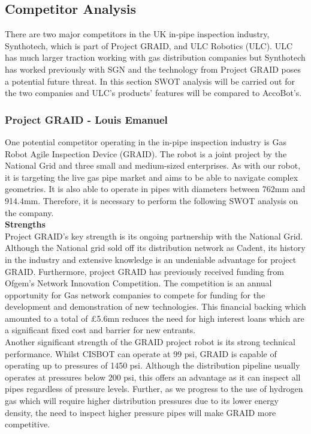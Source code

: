 \documentclass[11pt]{article}		%
\begin{document}
    \subsection{Competitor Analysis}
        There are two major competitors in the UK in-pipe inspection industry, Synthotech, which is part of Project GRAID, and ULC Robotics (ULC). ULC has much larger traction working with gas distribution companies but Synthotech has worked previously with SGN and the technology from Project GRAID poses a potential future threat. In this section SWOT analysis will be carried out for the two companies and ULC's products' features will be compared to AccoBot's.

		\subsubsection[Project GRAID]{Project GRAID - Louis Emanuel}
		
			One potential competitor operating in the in-pipe inspection industry is Gas Robot Agile Inspection Device (GRAID). The robot is a joint project by the National Grid and three small and medium-sized enterprises. As with our robot, it is targeting the live gas pipe market and aims to be able to navigate complex geometries. It is also able to operate in pipes with diameters between 762mm and 914.4mm. Therefore, it is necessary to perform the following SWOT analysis on the company. \\
			
			\textbf{Strengths} \\
			Project GRAID's key strength is its ongoing partnership with the National Grid. Although the National grid sold off its distribution network as Cadent, its history in the industry and extensive knowledge is an undeniable advantage for project GRAID. Furthermore, project GRAID has previously received funding from Ofgem's Network Innovation Competition. The competition is an annual opportunity for Gas network companies to compete for funding for the development and demonstration of new technologies. This financial backing which amounted to a total of £5.6mn reduces the need for high interest loans which are a significant fixed cost and barrier for new entrants. \\
		    \hspace*{3ex}Another significant strength of the GRAID project robot is its strong technical performance. Whilst CISBOT can operate at 99 psi, GRAID is capable of operating up to pressures of 1450 psi. Although the distribution pipeline usually operates at pressures below 200 psi, this offers an advantage as it can inspect all pipes regardless of pressure levels. Further, as we progress to the use of hydrogen gas which will require higher distribution pressures due to its lower energy density, the need to inspect higher pressure pipes will make GRAID more competitive. 
	        
\end{document}

